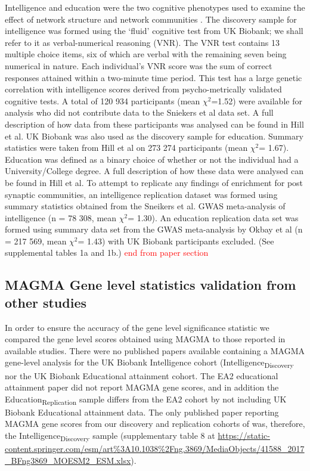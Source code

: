 Intelligence and education were the two cognitive phenotypes used to examine the effect of network structure and network communities . The discovery sample for intelligence was formed using the ‘fluid’ cognitive test from UK Biobank; we shall refer to it as verbal-numerical reasoning (VNR). The VNR test contains 13 multiple choice items, six of which are verbal with the remaining seven being numerical in nature. Each individual’s VNR score was the sum of correct responses attained within a two-minute time period. This test has a large genetic correlation with intelligence scores derived from psycho-metrically validated cognitive tests. A total of 120 934 participants (mean $\chi^2$=1.52) were available for analysis who did not contribute data to the Sniekers et al data set. A full description of how data from these participants was analysed can be found in Hill et al. \cite{hill2019combined} 
UK Biobank was also used as the discovery sample for education. Summary statistics were taken from Hill et al on 273 274 participants (mean  $\chi^2$= 1.67). \cite{hill2019combined}  Education was defined as a binary choice of whether or not the individual had a University/College degree. A full description of how these data were analysed can be found in Hill et al. \cite{hill2019combined}  
To attempt to replicate any findings of enrichment for post synaptic communities, an intelligence replication dataset was formed using summary statistics obtained from the Sneikers et al. GWAS meta-analysis of intelligence (n = 78 308, mean $\chi^2$= 1.30).  \cite{sniekers2017genome}  An education replication data set was formed using summary data set from the GWAS meta-analysis by Okbay et al (n = 217 569, mean $\chi^2$= 1.43) with UK Biobank participants excluded. \cite{okbay2016genome}  (See supplemental tables 1a and 1b.)
\textcolor{red}{end from paper section}

 
\subsection{MAGMA Gene level statistics validation from other studies}

In order to ensure the accuracy of the gene level significance statistic we compared the gene level scores obtained using MAGMA to those reported in available studies.\cite{de2015magma} There were no published papers available containing a MAGMA gene-level analysis for the UK Biobank Intelligence cohort (Intelligence\textsubscript{Discovery} nor the UK Biobank Educational attainment cohort. The EA2 \cite{okbay2016genome} educational attainment paper did not report MAGMA gene scores, and in addition the Education\textsubscript{Replication} sample differs from the EA2 cohort by not including UK Biobank Educational attainment data. The only published paper reporting MAGMA gene scores from our discovery and replication cohorts of was, therefore, the Intelligence\textsubscript{Discovery} sample \cite{sniekers2017genome} (supplementary table 8 at \url{https://static-content.springer.com/esm/art\%3A10.1038\%2Fng.3869/MediaObjects/41588_2017_BFng3869_MOESM2_ESM.xlsx}).

